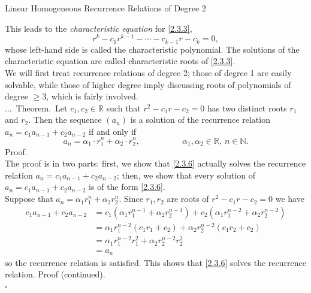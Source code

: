 \documentclass[smaller,hyperref={CJKbookmarks=true}]{beamer}
\newcommand{\N}{\mathbb{N}} \newcommand{\Z}{\mathbb{Z}} \newcommand{\Q}{\mathbb{Q}}
\newcommand{\R}{\mathbb{R}}
\newenvironment{PROOF}{{\noindent\!\sf\alert{Proof.}}\\}{\hfill$\square$\\}
\newcounter{zhuo}[subsection]
\renewcommand{\thezhuo}{\thesection.\thesubsection.\arabic{zhuo}}
\newenvironment{THEOREM}{\stepcounter{zhuo}\alert{\thezhuo.~Theorem.\,}}{}
\begin{document}
\begin{frame}{Linear Homogeneous Recurrence Relations of Degree 2}
\begin{spacing}{1.05}
This leads to the \emph{characteristic equation} for \eqref{2.3.3},
\begin{equation}\label{2.3.5}
r^k-c_1r^{k-1}-\cdots-c_{k-1}r-c_k=0,
\end{equation}
whose left-hand side is called the characteristic polynomial. The solutions
of the characteristic equation are called characteristic roots of \eqref{2.3.3}.\\[5pt]
We will first treat recurrence relations of degree 2; those of degree 1 are
easily solvable, while those of higher degree imply discussing roots of
polynomials of degree $\geq3$, which is fairly involved.\\[5pt]
\begin{THEOREM}
Let $c_1,c_2\in\R$ such that $r^2-c_1r-c_2=0$ has two distinct roots $r_1$ and $r_2$. Then the sequence  $(a_n)$ is a solution of the recurrence relation $a_n=c_1a_{n-1}+c_2a_{n-2}$ if and only if
\begin{equation}\label{2.3.6}
a_n=\alpha_1\cdot r_1^n+\alpha_2\cdot r_2^n,\qquad\qquad\quad
\alpha_1,\alpha_2\in\R,~n\in\N.
\end{equation}
\end{THEOREM}
\begin{PROOF}
The proof is in two parts: first, we show that \eqref{2.3.6} actually solves the recurrence relation $a_n=c_1a_{n-1}+c_2a_{n-2}$; then, we show that every solution of $a_n=c_1a_{n-1}+c_2a_{n-2}$ is of the form \eqref{2.3.6}.\\[5pt]
Suppose that $a_n=\alpha_1r_1^n+\alpha_2r_2^n$. Since $r_1,r_2$ are roots of $r^2-c_1r-c_2=0$ we have
\begin{equation*}
  \begin{split}
     c_1a_{n-1}+c_2a_{n-2} &=c_1(\alpha_1r_1^{n-1}+\alpha_2r_2^{n-1})+c_2(\alpha_1r_1^{n-2}+\alpha_2r_2^{n-2}) \\
       &=\alpha_1r_1^{n-2}(c_1r_1+c_2)+\alpha_2r_2^{n-2}(c_1r_2+c_2) \\
       &=\alpha_1r_1^{n-2}r_1^2+\alpha_2r_2^{n-2}r_2^2 \\
       &=a_n
  \end{split}
\end{equation*}
so the recurrence relation is satisfied. This shows that \eqref{2.3.6} solves the recurrence relation.
\newpage
\alert{Proof (continued).}\\

\end{PROOF}
\end{spacing}
\end{frame}
\end{document}
